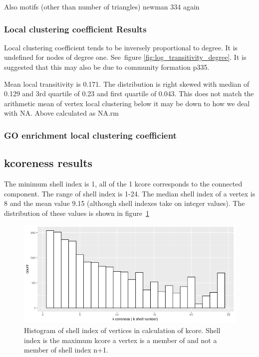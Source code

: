 Also motifs (other than number of triangles) newman 334 again

\subsubsection{Local clustering coefficient Results}
Local clustering coefficient tends to be inversely proportional to degree. It is undefined for nodes of degree one. See~figure \ref{fig:log_transitivity_degree}. It is suggested that this may also be due to community formation \cite{newman2018networks} p335.

Mean local transitivity is 0.171. The distribution is right skewed with median of 0.129 and 3rd quartile of 0.23 and first quartile of 0.043. This does not match the arithmetic mean of vertex local clustering below it may be down to how we deal with NA. Above calculated as NA.rm
\subsubsection{GO enrichment local clustering coefficient}

\subsection{kcoreness results}
 The minimum shell index is 1, all of the 1 kcore corresponds to the connected component. The range of shell index is 1-24. The median shell index of a vertex is 8 and the mean value 9.15 (although shell indexes take on integer values). The distribution of these values is shown in figure~\ref{fig:Kcore_histogram}
 
 \begin{figure}
     \centering
     \includegraphics[width=\textwidth]{images/Rplot01_kcore_hist.png}
     \caption{Histogram of shell index of vertices in calculation of kcore. Shell index is the maximum kcore a vertex is a member of and not a member of shell index n+1. }
     \label{fig:Kcore_histogram}
 \end{figure}
 

